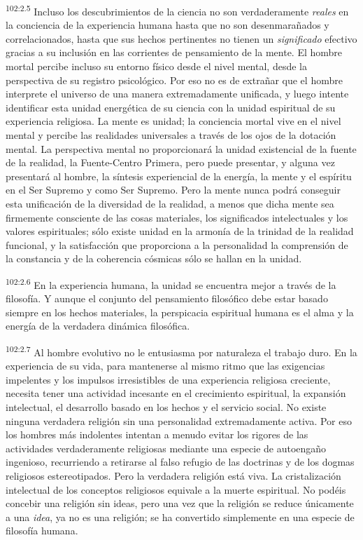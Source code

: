 \documentclass[twoside, 11pt]{book}
\begin{document}
\par
\textsuperscript{102:2.5} Incluso los descubrimientos de la ciencia no son verdaderamente \textit{reales} en la conciencia de la experiencia humana hasta que no son desenmarañados y correlacionados, hasta que sus hechos pertinentes no tienen un \textit{significado} efectivo gracias a su inclusión en las corrientes de pensamiento de la mente. El hombre mortal percibe incluso su entorno físico desde el nivel mental, desde la perspectiva de su registro psicológico. Por eso no es de extrañar que el hombre interprete el universo de una manera extremadamente unificada, y luego intente identificar esta unidad energética de su ciencia con la unidad espiritual de su experiencia religiosa. La mente es unidad; la conciencia mortal vive en el nivel mental y percibe las realidades universales a través de los ojos de la dotación mental. La perspectiva mental no proporcionará la unidad existencial de la fuente de la realidad, la Fuente-Centro Primera, pero puede presentar, y alguna vez presentará al hombre, la síntesis experiencial de la energía, la mente y el espíritu en el Ser Supremo y como Ser Supremo. Pero la mente nunca podrá conseguir esta unificación de la diversidad de la realidad, a menos que dicha mente sea firmemente consciente de las cosas materiales, los significados intelectuales y los valores espirituales; sólo existe unidad en la armonía de la trinidad de la realidad funcional, y la satisfacción que proporciona a la personalidad la comprensión de la constancia y de la coherencia cósmicas sólo se hallan en la unidad.

\par
\textsuperscript{102:2.6} En la experiencia humana, la unidad se encuentra mejor a través de la filosofía. Y aunque el conjunto del pensamiento filosófico debe estar basado siempre en los hechos materiales, la perspicacia espiritual humana es el alma y la energía de la verdadera dinámica filosófica.

\par
\textsuperscript{102:2.7} Al hombre evolutivo no le entusiasma por naturaleza el trabajo duro. En la experiencia de su vida, para mantenerse al mismo ritmo que las exigencias impelentes y los impulsos irresistibles de una experiencia religiosa creciente, necesita tener una actividad incesante en el crecimiento espiritual, la expansión intelectual, el desarrollo basado en los hechos y el servicio social. No existe ninguna verdadera religión sin una personalidad extremadamente activa. Por eso los hombres más indolentes intentan a menudo evitar los rigores de las actividades verdaderamente religiosas mediante una especie de autoengaño ingenioso, recurriendo a retirarse al falso refugio de las doctrinas y de los dogmas religiosos estereotipados. Pero la verdadera religión está viva. La cristalización intelectual de los conceptos religiosos equivale a la muerte espiritual. No podéis concebir una religión sin ideas, pero una vez que la religión se reduce únicamente a una \textit{idea}, ya no es una religión; se ha convertido simplemente en una especie de filosofía humana.
\end{document}
